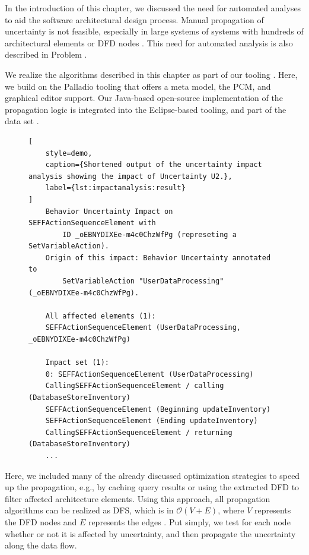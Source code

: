 In the introduction of this chapter, we discussed the need for automated analyses to aid the software architectural design process.
Manual propagation of uncertainty is not feasible, especially in large systems of systems with hundreds of architectural elements or \ac{DFD} nodes \cite{hahner_architecture-based_2023}.
This need for automated analysis is also described in Problem .

We realize the algorithms described in this chapter as part of our tooling \uia.
Here, we build on the Palladio tooling \cite{reussner_modeling_2016,reussner_palladio_2024} that offers a meta model, the \ac{PCM}, and graphical editor support.
Our Java-based open-source implementation of the propagation logic is integrated into the Eclipse-based tooling, and part of the data set \cite{dataset}.

\begin{figure}
\begin{lstlisting}[
    style=demo,
    caption={Shortened output of the uncertainty impact analysis showing the impact of Uncertainty U2.},
    label={lst:impactanalysis:result}
]
    Behavior Uncertainty Impact on SEFFActionSequenceElement with 
        ID _oEBNYDIXEe-m4c0ChzWfPg (represeting a SetVariableAction).
    Origin of this impact: Behavior Uncertainty annotated to 
        SetVariableAction "UserDataProcessing" (_oEBNYDIXEe-m4c0ChzWfPg).

    All affected elements (1):
    SEFFActionSequenceElement (UserDataProcessing, _oEBNYDIXEe-m4c0ChzWfPg)

    Impact set (1):
    0: SEFFActionSequenceElement (UserDataProcessing)
    CallingSEFFActionSequenceElement / calling (DatabaseStoreInventory)
    SEFFActionSequenceElement (Beginning updateInventory)
    SEFFActionSequenceElement (Ending updateInventory)
    CallingSEFFActionSequenceElement / returning (DatabaseStoreInventory)
    ...
\end{lstlisting}
\end{figure}

Here, we included many of the already discussed optimization strategies to speed up the propagation, e.g., by caching query results or using the extracted \ac{DFD} to filter affected architecture elements.
Using this approach, all propagation algorithms can be realized as \ac{DFS}, which is in $\mathcal{O}(V + E)$, where $V$ represents the \ac{DFD} nodes and $E$ represents the edges \cite{knuth_art_1997}.
Put simply, we test for each node whether or not it is affected by uncertainty, and then propagate the uncertainty along the data flow.

